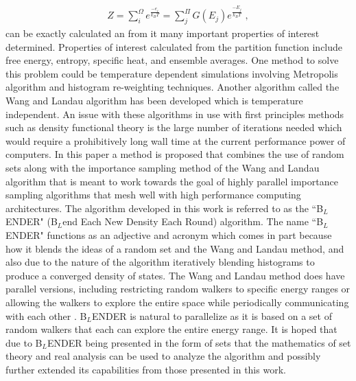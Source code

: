 \documentclass[aps,prl,reprint,superscriptaddress,showkeys]{revtex4-1}
\begin{document}
\begin{equation}
\begin{split}
Z = \sum_{i}^{\Omega}e^{\frac{-e_i}{k_B T} }= \sum_{j}^{\Pi}G(E_j)e^{\frac{-E_j}{k_BT}} \;,
\end{split}
\end{equation}
can be exactly calculated an from it many important properties of interest determined. Properties of interest calculated from the partition function include  free energy, entropy, specific heat, and ensemble averages. One method to solve this problem could be temperature dependent simulations involving  Metropolis algorithm and histogram re-weighting techniques\cite{landau_MC_simulations}.  Another algorithm called the  Wang and Landau algorithm\cite{WL_phys_rev_lett} has been developed which is temperature independent. An issue with these algorithms in use with first principles methods such as density functional theory is the large number of iterations needed which would require a prohibitively long wall time at the current performance power of computers.  In this paper a method is proposed that combines the use of random sets along with the importance sampling method of the Wang and Landau algorithm that is meant to work towards the goal of highly parallel importance sampling algorithms that mesh well with high performance computing architectures. The algorithm developed in this work is referred to as the ``B$_{L}$ENDER" (B$_{L}$end Each New Density Each Round) algorithm. The name ``B$_{L}$ENDER" functions as an  adjective and acronym  which comes in part because how it blends the ideas of a random set and the Wang and Landau method, and also due to the nature of the algorithm iteratively blending histograms to produce a converged density of states.  The Wang and Landau method does have parallel versions, including  restricting random walkers to specific energy ranges or allowing the walkers to explore the entire space while periodically communicating with each other \cite{MP_Wang_Landau,P_imp_Wang_Landau, Hframe_Wang_Landau}.  B$_{L}$ENDER is natural to parallelize as it is based on a set of random walkers that each can explore the entire energy range. It is hoped that due to B$_{L}$ENDER being presented in the form of sets that the mathematics of set theory and real analysis can be used to analyze the algorithm and possibly further extended its capabilities from those presented in this work. 
\end{document}
